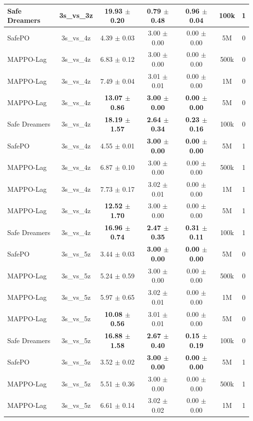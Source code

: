 \documentclass{article}
\begin{document}
\begin{longtable}{lcccccc}
Safe Dreamers & 3s\_vs\_3z & \textbf{19.93 $\pm$ 0.20} & \textbf{0.79 $\pm$ 0.48} & \textbf{0.96 $\pm$ 0.04} & 100k & 1 \\
\midrule
SafePO & 3s\_vs\_4z & 4.39 $\pm$ 0.03 & 3.00 $\pm$ 0.00 & 0.00 $\pm$ 0.00 & 5M & 0 \\
MAPPO-Lag & 3s\_vs\_4z & 6.83 $\pm$ 0.12 & 3.00 $\pm$ 0.00 & 0.00 $\pm$ 0.00 & 500k & 0 \\
MAPPO-Lag & 3s\_vs\_4z & 7.49 $\pm$ 0.04 & 3.01 $\pm$ 0.01 & 0.00 $\pm$ 0.00 & 1M & 0 \\
MAPPO-Lag & 3s\_vs\_4z & \textbf{13.07 $\pm$ 0.86} & \textbf{3.00 $\pm$ 0.00} & \textbf{0.00 $\pm$ 0.00} & 5M & 0 \\
Safe Dreamers & 3s\_vs\_4z & \textbf{18.19 $\pm$ 1.57} & \textbf{2.64 $\pm$ 0.34} & \textbf{0.23 $\pm$ 0.16} & 100k & 0 \\
\midrule
SafePO & 3s\_vs\_4z & 4.55 $\pm$ 0.01 & \textbf{3.00 $\pm$ 0.00} & \textbf{0.00 $\pm$ 0.00} & 5M & 1 \\
MAPPO-Lag & 3s\_vs\_4z & 6.87 $\pm$ 0.10 & 3.00 $\pm$ 0.00 & 0.00 $\pm$ 0.00 & 500k & 1 \\
MAPPO-Lag & 3s\_vs\_4z & 7.73 $\pm$ 0.17 & 3.02 $\pm$ 0.01 & 0.00 $\pm$ 0.00 & 1M & 1 \\
MAPPO-Lag & 3s\_vs\_4z & \textbf{12.52 $\pm$ 1.70} & 3.00 $\pm$ 0.00 & 0.00 $\pm$ 0.00 & 5M & 1 \\
Safe Dreamers & 3s\_vs\_4z & \textbf{16.96 $\pm$ 0.74} & \textbf{2.47 $\pm$ 0.35} & \textbf{0.31 $\pm$ 0.11} & 100k & 1 \\
\midrule
SafePO & 3s\_vs\_5z & 3.44 $\pm$ 0.03 & \textbf{3.00 $\pm$ 0.00} & \textbf{0.00 $\pm$ 0.00} & 5M & 0 \\
MAPPO-Lag & 3s\_vs\_5z & 5.24 $\pm$ 0.59 & 3.00 $\pm$ 0.00 & 0.00 $\pm$ 0.00 & 500k & 0 \\
MAPPO-Lag & 3s\_vs\_5z & 5.97 $\pm$ 0.65 & 3.02 $\pm$ 0.01 & 0.00 $\pm$ 0.00 & 1M & 0 \\
MAPPO-Lag & 3s\_vs\_5z & \textbf{10.08 $\pm$ 0.56} & 3.01 $\pm$ 0.01 & 0.00 $\pm$ 0.00 & 5M & 0 \\
Safe Dreamers & 3s\_vs\_5z & \textbf{16.88 $\pm$ 1.58} & \textbf{2.67 $\pm$ 0.40} & \textbf{0.15 $\pm$ 0.19} & 100k & 0 \\
\midrule
SafePO & 3s\_vs\_5z & 3.52 $\pm$ 0.02 & \textbf{3.00 $\pm$ 0.00} & \textbf{0.00 $\pm$ 0.00} & 5M & 1 \\
MAPPO-Lag & 3s\_vs\_5z & 5.51 $\pm$ 0.36 & 3.00 $\pm$ 0.00 & 0.00 $\pm$ 0.00 & 500k & 1 \\
MAPPO-Lag & 3s\_vs\_5z & 6.61 $\pm$ 0.14 & 3.02 $\pm$ 0.02 & 0.00 $\pm$ 0.00 & 1M & 1 \\

\end{longtable}
\end{document}
